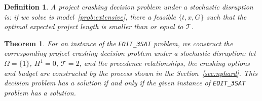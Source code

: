 \documentclass[11pt]{article}
\newtheorem{theorem}{Theorem}
\newtheorem{definition}{Definition}
\begin{document}
		\begin{definition}
			A project crashing decision problem under a stochastic disruption is: if we solve is model~\ref{prob:extensive}, there a feasible \(\{t,x,G\}\) such that the optimal expected project length is smaller than or equal to \(\mathcal{T}\).
		\end{definition}
		\begin{theorem}\label{thm:npcomplete}
			For an instance of the \verb|EOIT_3SAT| problem, we construct the corresponding project crashing decision problem under a stochastic disruption: let \(\Omega = \{1\}\), \(H^1 = 0\), \(\mathcal{T} = 2\), and the precedence relationships, the crashing options and budget are constructed by the process shown in the Section~\ref{sec:nphard}. This decision problem has a solution if and only if the given instance of \verb|EOIT_3SAT| problem has a solution.
		\end{theorem}
\end{document}
